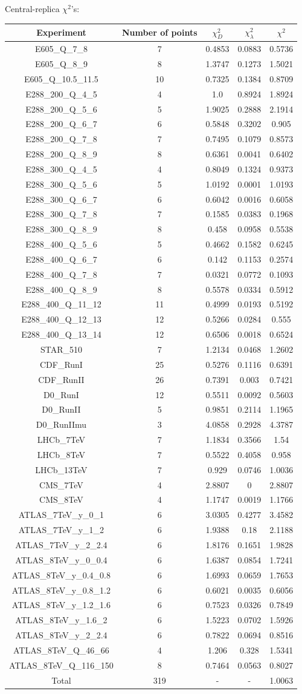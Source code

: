 \documentclass[
]{article}
\begin{document}
Central-replica \(\chi^2\)'s:

\begin{longtable}[]{@{}ccccc@{}}
\toprule
Experiment & Number of points & \(\chi_{D}^2\) & \(\chi_{\lambda}^2\) &
\(\chi^2\)\tabularnewline
\midrule
\endhead
E605\_Q\_7\_8 & 7 & 0.4853 & 0.0883 & 0.5736\tabularnewline
E605\_Q\_8\_9 & 8 & 1.3747 & 0.1273 & 1.5021\tabularnewline
E605\_Q\_10.5\_11.5 & 10 & 0.7325 & 0.1384 & 0.8709\tabularnewline
E288\_200\_Q\_4\_5 & 4 & 1.0 & 0.8924 & 1.8924\tabularnewline
E288\_200\_Q\_5\_6 & 5 & 1.9025 & 0.2888 & 2.1914\tabularnewline
E288\_200\_Q\_6\_7 & 6 & 0.5848 & 0.3202 & 0.905\tabularnewline
E288\_200\_Q\_7\_8 & 7 & 0.7495 & 0.1079 & 0.8573\tabularnewline
E288\_200\_Q\_8\_9 & 8 & 0.6361 & 0.0041 & 0.6402\tabularnewline
E288\_300\_Q\_4\_5 & 4 & 0.8049 & 0.1324 & 0.9373\tabularnewline
E288\_300\_Q\_5\_6 & 5 & 1.0192 & 0.0001 & 1.0193\tabularnewline
E288\_300\_Q\_6\_7 & 6 & 0.6042 & 0.0016 & 0.6058\tabularnewline
E288\_300\_Q\_7\_8 & 7 & 0.1585 & 0.0383 & 0.1968\tabularnewline
E288\_300\_Q\_8\_9 & 8 & 0.458 & 0.0958 & 0.5538\tabularnewline
E288\_400\_Q\_5\_6 & 5 & 0.4662 & 0.1582 & 0.6245\tabularnewline
E288\_400\_Q\_6\_7 & 6 & 0.142 & 0.1153 & 0.2574\tabularnewline
E288\_400\_Q\_7\_8 & 7 & 0.0321 & 0.0772 & 0.1093\tabularnewline
E288\_400\_Q\_8\_9 & 8 & 0.5578 & 0.0334 & 0.5912\tabularnewline
E288\_400\_Q\_11\_12 & 11 & 0.4999 & 0.0193 & 0.5192\tabularnewline
E288\_400\_Q\_12\_13 & 12 & 0.5266 & 0.0284 & 0.555\tabularnewline
E288\_400\_Q\_13\_14 & 12 & 0.6506 & 0.0018 & 0.6524\tabularnewline
STAR\_510 & 7 & 1.2134 & 0.0468 & 1.2602\tabularnewline
CDF\_RunI & 25 & 0.5276 & 0.1116 & 0.6391\tabularnewline
CDF\_RunII & 26 & 0.7391 & 0.003 & 0.7421\tabularnewline
D0\_RunI & 12 & 0.5511 & 0.0092 & 0.5603\tabularnewline
D0\_RunII & 5 & 0.9851 & 0.2114 & 1.1965\tabularnewline
D0\_RunIImu & 3 & 4.0858 & 0.2928 & 4.3787\tabularnewline
LHCb\_7TeV & 7 & 1.1834 & 0.3566 & 1.54\tabularnewline
LHCb\_8TeV & 7 & 0.5522 & 0.4058 & 0.958\tabularnewline
LHCb\_13TeV & 7 & 0.929 & 0.0746 & 1.0036\tabularnewline
CMS\_7TeV & 4 & 2.8807 & 0 & 2.8807\tabularnewline
CMS\_8TeV & 4 & 1.1747 & 0.0019 & 1.1766\tabularnewline
ATLAS\_7TeV\_y\_0\_1 & 6 & 3.0305 & 0.4277 & 3.4582\tabularnewline
ATLAS\_7TeV\_y\_1\_2 & 6 & 1.9388 & 0.18 & 2.1188\tabularnewline
ATLAS\_7TeV\_y\_2\_2.4 & 6 & 1.8176 & 0.1651 & 1.9828\tabularnewline
ATLAS\_8TeV\_y\_0\_0.4 & 6 & 1.6387 & 0.0854 & 1.7241\tabularnewline
ATLAS\_8TeV\_y\_0.4\_0.8 & 6 & 1.6993 & 0.0659 & 1.7653\tabularnewline
ATLAS\_8TeV\_y\_0.8\_1.2 & 6 & 0.6021 & 0.0035 & 0.6056\tabularnewline
ATLAS\_8TeV\_y\_1.2\_1.6 & 6 & 0.7523 & 0.0326 & 0.7849\tabularnewline
ATLAS\_8TeV\_y\_1.6\_2 & 6 & 1.5223 & 0.0702 & 1.5926\tabularnewline
ATLAS\_8TeV\_y\_2\_2.4 & 6 & 0.7822 & 0.0694 & 0.8516\tabularnewline
ATLAS\_8TeV\_Q\_46\_66 & 4 & 1.206 & 0.328 & 1.5341\tabularnewline
ATLAS\_8TeV\_Q\_116\_150 & 8 & 0.7464 & 0.0563 & 0.8027\tabularnewline
Total & 319 & - & - & 1.0063\tabularnewline
\bottomrule
\end{longtable}
\end{document}
